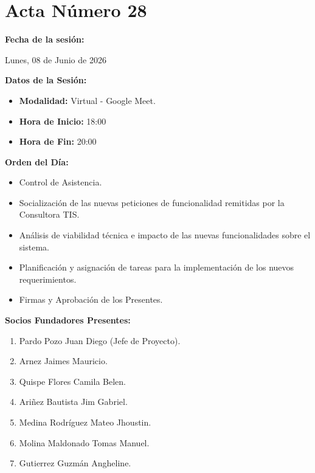 \newpage
\section{Acta Número 28}
\label{sec:acta28}

\noindent \textbf{Fecha de la sesión:}\par
Lunes, 08 de Junio de 2026

\vspace*{0.5cm}
\noindent \textbf{Datos de la Sesión:}
\vspace{-0.2cm}
\begin{itemize}[noitemsep]
    \item \textbf{Modalidad:} Virtual - Google Meet.
    \item \textbf{Hora de Inicio:} 18:00
    \item \textbf{Hora de Fin:} 20:00
\end{itemize}

\vspace*{0.5cm}
\noindent \textbf{Orden del Día:}
\vspace{-0.2cm}
\begin{itemize}[noitemsep]
    \item Control de Asistencia.
    \item Socialización de las nuevas peticiones de funcionalidad remitidas por la Consultora TIS.
    \item Análisis de viabilidad técnica e impacto de las nuevas funcionalidades sobre el sistema.
    \item Planificación y asignación de tareas para la implementación de los nuevos requerimientos.
    \item Firmas y Aprobación de los Presentes.
\end{itemize}

\vspace*{0.5cm}
\noindent \textbf{Socios Fundadores Presentes:}
\vspace{-0.2cm}
\begin{enumerate}[noitemsep]
    \item Pardo Pozo Juan Diego (Jefe de Proyecto).
    \item Arnez Jaimes Mauricio.
    \item Quispe Flores Camila Belen.
    \item Ariñez Bautista Jim Gabriel.
    \item Medina Rodríguez Mateo Jhoustin.
    \item Molina Maldonado Tomas Manuel.
    \item Gutierrez Guzmán Angheline.
\end{enumerate}

